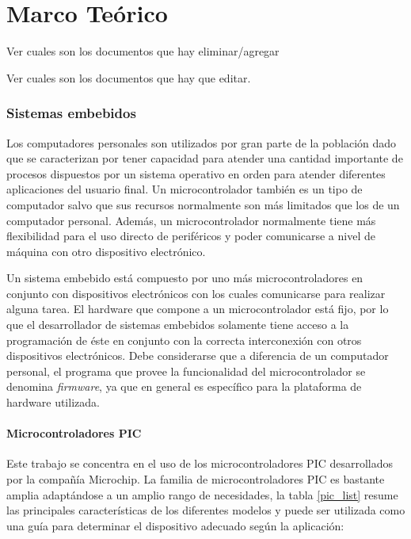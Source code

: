 \chapter{Marco Teórico}

Ver cuales son los documentos que hay eliminar/agregar

 Ver cuales son los documentos que hay que editar.

\subsection{Sistemas embebidos}
Los computadores personales son utilizados por gran parte de la población dado que se caracterizan por tener capacidad para atender una cantidad importante de procesos dispuestos por un sistema operativo en orden para atender diferentes aplicaciones  del usuario final. Un microcontrolador tambi\'en es un tipo de computador salvo que sus recursos normalmente son más limitados que los de un computador personal. Además, un microcontrolador normalmente tiene más flexibilidad para el uso directo de perif\'ericos y poder comunicarse a nivel de máquina con otro dispositivo electrónico.

Un sistema embebido está compuesto por uno más microcontroladores en conjunto con dispositivos electrónicos con los cuales comunicarse para realizar alguna tarea. 
El hardware que compone a un microcontrolador está fijo, por lo que el desarrollador de sistemas embebidos solamente tiene acceso a la programación de \'este en conjunto con la correcta interconexión con otros dispositivos electrónicos. Debe considerarse que a diferencia de un computador personal, el programa que provee la funcionalidad del microcontrolador se denomina \textit{firmware}, ya que en general es específico para la plataforma de hardware utilizada.

\subsubsection{Microcontroladores PIC}
Este trabajo se concentra en el uso de los microcontroladores PIC desarrollados por la compañía Microchip. La familia de microcontroladores  PIC es bastante amplia adaptándose a un amplio rango de necesidades, la tabla \ref{pic_list} resume las principales características de los diferentes modelos y puede ser utilizada como una guía para determinar el dispositivo adecuado según la aplicación:

